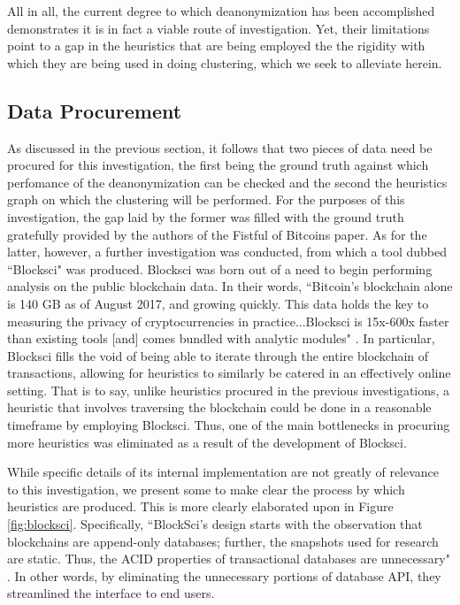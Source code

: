 \documentclass[journal]{IEEEtran}
\begin{document}
All in all, the current degree to which deanonymization has been accomplished demonstrates it is in fact a viable route of investigation. Yet, their limitations point to a gap in the heuristics that are being employed the the rigidity with which they are being used in doing clustering, which we seek to alleviate herein.

\subsection{Data Procurement}
As discussed in the previous section, it follows that two pieces of data need be procured for this investigation, the first being the ground truth against which perfomance of the deanonymization can be checked and the second the heuristics graph on which the clustering will be performed. For the purposes of this investigation, the gap laid by the former was filled with the ground truth gratefully provided by the authors of the Fistful of Bitcoins paper. As for the latter, however, a further investigation was conducted, from which a tool dubbed ``Blocksci" was produced. Blocksci was born out of a need to begin performing analysis on the public blockchain data. In their words, ``Bitcoin's blockchain alone is 140 GB as of August 2017, and growing quickly. This data holds the key to measuring the privacy of cryptocurrencies in practice...Blocksci is 15x-600x faster than existing tools [and] comes bundled with analytic modules" \cite{blocksci}. In particular, Blocksci fills the void of being able to iterate through the entire blockchain of transactions, allowing for heuristics to similarly be catered in an effectively online setting. That is to say, unlike heuristics procured in the previous investigations, a heuristic that involves traversing the blockchain could be done in a reasonable timeframe by employing Blocksci. Thus, one of the main bottlenecks in procuring more heuristics was eliminated as a result of the development of Blocksci.

While specific details of its internal implementation are not greatly of relevance to this investigation, we present some to make clear the process by which heuristics are produced. This is more clearly elaborated upon in Figure \ref{fig:blocksci}. Specifically, ``BlockSci's design starts with the observation that blockchains are append-only databases; further, the snapshots used for research are static. Thus, the ACID properties of transactional databases are unnecessary" \cite{blocksci}. In other words, by eliminating the unnecessary portions of database API, they streamlined the interface to end users. 
\end{document}

